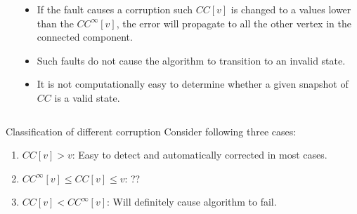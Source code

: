 \begin{columns}
\begin{column}{0.5\textwidth}
{}
\end{column}
\begin{column}{0.5\textwidth}
\begin{itemize}
	\item If the fault causes a corruption such $CC[v]$ is changed to a values lower than the $CC^{\infty}[v]$, the error will propagate to all the other vertex in the connected component. 
	\item Such faults do not cause the algorithm to transition to an invalid state.
	\item \color{red} It is not computationally easy to determine whether a given snapshot of $CC$ is a valid state. 
\end{itemize}
\end{column}

\end{columns}
\lyxframeend{}

\begin{block}{Classification of different corruption}
Consider following three cases:
\begin{enumerate}
	\item<1-> $CC[v]>v$: Easy to detect and automatically corrected in most cases.  
	\item<2-> $CC^{\infty}[v] \leq CC[v] \leq v$: ??
	\item<3-> {\color{red} $CC[v] < CC^{\infty}[v]$: Will definitely cause algorithm to fail. }
\end{enumerate}
\end{block}


